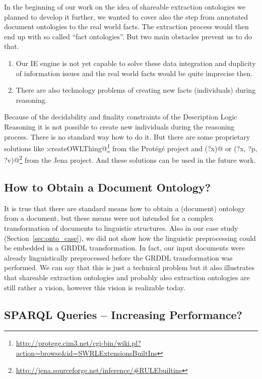 In the beginning of our work on the idea of shareable extraction ontologies we planned to develop it further, we wanted to cover also the step from annotated document ontologies to the real world facts. The extraction process would then end up with so called ``fact ontologies''. But two main obstacles prevent us to do that.

\begin{enumerate}
	\item Our IE engine is not yet capable to solve these data integration and duplicity of information issues and the real world facts would be quite imprecise then.
	\item There are also technology problems of creating new facts (individuals) during reasoning.
\end{enumerate}

Because of the decidability and finality constraints of the Description Logic Reasoning it is not possible to create new individuals during the reasoning process. There is no standard way how to do it. But there are some proprietary solutions like \verb@swrlx:createOWLThing@\footnote{\url{http://protege.cim3.net/cgi-bin/wiki.pl?action=browse&id=SWRLExtensionsBuiltIns}} from the Prot\'{e}g\'{e} project and \verb@makeTemp(?x)@ or \verb@makeInstance(?x, ?p, ?v)@\footnote{\url{http://jena.sourceforge.net/inference/#RULEbuiltins}} from the Jena project.
And these solutions can be used in the future work. 

\subsection{How to Obtain a Document Ontology?}

It is true that there are standard means how to obtain a (document) ontology from a document, but these means were not intended for a complex transformation of documents to linguistic structures. Also in our case study (Section~\ref{sec:onto_case}), we did not show how the linguistic preprocessing could be embedded in a GRDDL transformation. In fact, our input documents were already linguistically preprocessed before the GRDDL transformation was performed. We can say that this is just a technical problem but it also illustrates that shareable extraction ontologies and probably also extraction ontologies are still rather a vision, however this vision is realizable today.

\subsection{SPARQL Queries -- Increasing Performance?}

